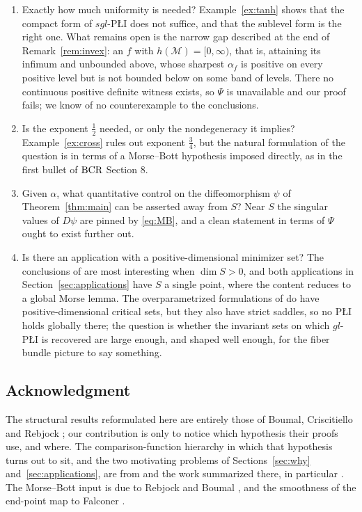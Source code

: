 \documentclass[11pt]{article}
\theoremstyle{plain}
\theoremstyle{definition}
\theoremstyle{remark}
\newcommand{\M}{\mathcal{M}}
\newcommand{\bcr}{\textup{BCR}}
\begin{document}
\begin{enumerate}
\item Exactly how much uniformity is needed? Example~\ref{ex:tanh} shows that the
compact form of $sgl$-P\L{}I does not suffice, and that the sublevel form is the
right one. What remains open is the narrow gap described at the end of
Remark~\ref{rem:invex}: an $f$ with $h(\M)=[0,\infty)$, that is, attaining its
infimum and unbounded above, whose sharpest $\alpha_f$ is positive on every
positive level but is not bounded below on some band of levels. There
no continuous positive definite witness exists, so $\Psi$ is unavailable and our
proof fails; we know of no counterexample to the conclusions.
\item Is the exponent $\tfrac12$ needed, or only the nondegeneracy it implies?
Example~\ref{ex:cross} rules out exponent $\tfrac34$, but the natural
formulation of the question is in terms of a Morse--Bott hypothesis imposed
directly, as in the first bullet of $\bcr$ Section 8.
\item Given $\alpha$, what quantitative control on the diffeomorphism $\psi$ of
Theorem~\ref{thm:main} can be asserted away from $S$? Near $S$ the singular
values of $D\psi$ are pinned by \eqref{eq:MB}, and a clean statement in terms of
$\Psi$ ought to exist further out.
\item Is there an application with a positive-dimensional minimizer set? The
conclusions of \cite{BCR2026} are most interesting when $\dim S>0$, and both
applications in Section~\ref{sec:applications} have $S$ a single point, where the
content reduces to a global Morse lemma. The overparametrized formulations of
\cite{deOliveiraSiamiSontag2025, WafiEtAl} do have positive-dimensional critical
sets, but they also have strict saddles, so no P\L{}I holds globally there; the
question is whether the invariant sets on which $gl$-P\L{}I is recovered are large
enough, and shaped well enough, for the fiber bundle picture to say something.
\end{enumerate}

\subsection*{Acknowledgment}

The structural results reformulated here are entirely those of Boumal,
Criscitiello and Rebjock \cite{BCR2026}; our contribution is only to notice which
hypothesis their proofs use, and where. The comparison-function hierarchy in which
that hypothesis turns out to sit, and the two motivating problems of
Sections~\ref{sec:why} and~\ref{sec:applications}, are from
\cite{Sontag2025L4DC} and the work summarized there, in particular
\cite{CuiJiangSontag2024, CuiJiangSontag2026}. The Morse--Bott input is due to
Rebjock and Boumal \cite{RB2024a}, and the smoothness of the end-point map to
Falconer \cite{Falconer1983}.
\end{document}
